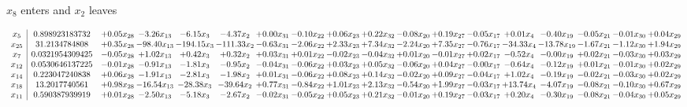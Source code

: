 \documentclass[9pt]{article}
\begin{document}
 $ x_{8} $ enters and $ x_{2} $ leaves 

 \[\begin{array}{c| c c@{\hskip 2pt} c@{\hskip 2pt} c@{\hskip 2pt} c@{\hskip 2pt} c@{\hskip 2pt} c@{\hskip 2pt} c@{\hskip 2pt} c@{\hskip 2pt} c@{\hskip 2pt} c@{\hskip 2pt} c@{\hskip 2pt} c@{\hskip 2pt} c@{\hskip 2pt} c@{\hskip 2pt} c@{\hskip 2pt} c@{\hskip 2pt} }
 x_{5}   &  0.898923183732 & +  0.05 x_{28} & -3.26 x_{13} & -6.15 x_{3} & -4.37 x_{2} & +  0.00 x_{31} & -0.10 x_{22} & +  0.06 x_{23} & +  0.22 x_{32} & -0.08 x_{20} & +  0.19 x_{27} & -0.05 x_{17} & +  0.01 x_{4} & -0.40 x_{19} & -0.05 x_{21} & -0.01 x_{30} & +  0.04 x_{29}\\
 x_{25}   &  31.2134784808 & +  0.35 x_{28} & -98.40 x_{13} & -194.15 x_{3} & -111.33 x_{2} & -0.63 x_{31} & -2.06 x_{22} & +  2.33 x_{23} & +  7.34 x_{32} & -2.24 x_{20} & +  7.35 x_{27} & -0.76 x_{17} & -34.33 x_{4} & -13.78 x_{19} & -1.67 x_{21} & -1.12 x_{30} & +  1.94 x_{29}\\
 x_{7}   &  0.0321954309425 & -0.05 x_{28} & +  1.02 x_{13} & +  0.42 x_{3} & +  0.32 x_{2} & +  0.03 x_{31} & +  0.01 x_{22} & -0.02 x_{23} & -0.04 x_{32} & +  0.01 x_{20} & -0.01 x_{27} & +  0.02 x_{17} & -0.52 x_{4} & -0.00 x_{19} & +  0.02 x_{21} & -0.03 x_{30} & +  0.03 x_{29}\\
 x_{12}   &  0.0530646137225 & -0.01 x_{28} & -0.91 x_{13} & -1.81 x_{3} & -0.95 x_{2} & -0.04 x_{31} & -0.06 x_{22} & +  0.03 x_{23} & +  0.05 x_{32} & -0.06 x_{20} & +  0.04 x_{27} & -0.00 x_{17} & -0.64 x_{4} & -0.12 x_{19} & +  0.01 x_{21} & -0.01 x_{30} & +  0.02 x_{29}\\
 x_{14}   &  0.223047240838 & +  0.06 x_{28} & -1.91 x_{13} & -2.81 x_{3} & -1.98 x_{2} & +  0.01 x_{31} & -0.06 x_{22} & +  0.08 x_{23} & +  0.14 x_{32} & -0.02 x_{20} & +  0.09 x_{27} & -0.04 x_{17} & +  1.02 x_{4} & -0.19 x_{19} & -0.02 x_{21} & -0.03 x_{30} & +  0.02 x_{29}\\
 x_{18}   &  13.2017740561 & +  0.98 x_{28} & -16.54 x_{13} & -28.38 x_{3} & -39.64 x_{2} & +  0.77 x_{31} & -0.84 x_{22} & +  1.01 x_{23} & +  2.13 x_{32} & -0.54 x_{20} & +  1.99 x_{27} & -0.03 x_{17} & + 13.74 x_{4} & -4.07 x_{19} & -0.08 x_{21} & -0.10 x_{30} & +  0.67 x_{29}\\
 x_{11}   &  0.590387939919 & +  0.01 x_{28} & -2.50 x_{13} & -5.18 x_{3} & -2.67 x_{2} & -0.02 x_{31} & -0.05 x_{22} & +  0.05 x_{23} & +  0.21 x_{32} & -0.01 x_{20} & +  0.19 x_{27} & -0.03 x_{17} & +  0.20 x_{4} & -0.30 x_{19} & -0.08 x_{21} & -0.04 x_{30} & +  0.05 x_{29}\\

\end{array}\]
\end{document}
